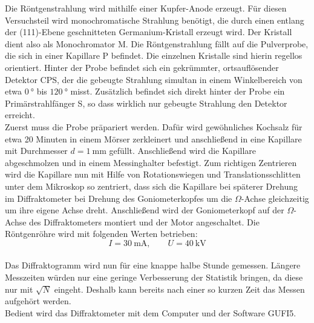 Die Röntgenstrahlung wird mithilfe einer Kupfer-Anode erzeugt. Für diesen Versuchsteil wird monochromatische Strahlung benötigt, die durch einen entlang der (111)-Ebene geschnitteten Germanium-Kristall erzeugt wird. Der Kristall dient also als Monochromator M. Die Röntgenstrahlung fällt auf die Pulverprobe, die sich in einer Kapillare P befindet. Die einzelnen Kristalle sind hierin regellos orientiert. Hinter der Probe befindet sich ein gekrümmter, ortsauflösender Detektor CPS, der die gebeugte Strahlung simultan in einem Winkelbereich von etwa $\SI{0}{\degree}$ bis $\SI{120}{\degree}$ misst. Zusätzlich befindet sich direkt hinter der Probe ein Primärstrahlfänger S, so dass wirklich nur gebeugte Strahlung den Detektor erreicht.\\
Zuerst muss die Probe präpariert werden. Dafür wird gewöhnliches Kochsalz für etwa 20 Minuten in einem Mörser zerkleinert und anschließend in eine Kapillare mit Durchmesser $d = \SI{1}{\milli\metre}$ gefüllt. Anschließend wird die Kapillare abgeschmolzen und in einem Messinghalter befestigt. Zum richtigen Zentrieren wird die Kapillare nun mit Hilfe von Rotationswiegen und Translationsschlitten unter dem Mikroskop so zentriert, dass sich die Kapillare bei späterer Drehung im Diffraktometer bei Drehung des Goniometerkopfes um die $\Omega$-Achse gleichzeitig um ihre eigene Achse dreht. Anschließend wird der Goniometerkopf auf der $\Omega$-Achse des Diffraktometers montiert und der Motor angeschaltet. Die Röntgenröhre wird mit folgenden Werten betrieben:
\begin{equation}
    I = \SI[]{30}[]{\milli\ampere}, \qquad U = \SI[]{40}[]{\kilo\volt}
\end{equation}\\
Das Diffraktogramm wird nun für eine knappe halbe Stunde gemessen. Längere Messzeiten würden nur eine geringe Verbesserung der Statistik bringen, da diese nur mit $\sqrt{N}$ eingeht. Deshalb kann bereits nach einer so kurzen Zeit das Messen aufgehört werden.\\
Bedient wird das Diffraktometer mit dem Computer und der Software GUFI5. 